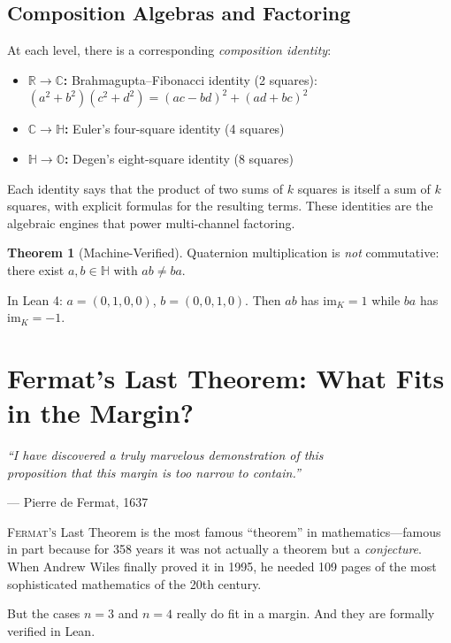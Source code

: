 \documentclass[11pt,twoside,openright]{book}
\theoremstyle{definition}
\newtheorem{theorem}{Theorem}[chapter]
\newcommand{\R}{\mathbb{R}}
\newcommand{\C}{\mathbb{C}}
\newcommand{\HH}{\mathbb{H}}
\newcommand{\OO}{\mathbb{O}}
\begin{document}
\section{Composition Algebras and Factoring}

At each level, there is a corresponding \emph{composition identity}:
\begin{itemize}
\item \textbf{$\R \to \C$:} Brahmagupta--Fibonacci identity (2 squares):
$(a^2+b^2)(c^2+d^2) = (ac-bd)^2 + (ad+bc)^2$
\item \textbf{$\C \to \HH$:} Euler's four-square identity (4 squares)
\item \textbf{$\HH \to \OO$:} Degen's eight-square identity (8 squares)
\end{itemize}

Each identity says that the product of two sums of $k$ squares is itself
a sum of $k$ squares, with explicit formulas for the resulting terms.
These identities are the algebraic engines that power multi-channel factoring.

\begin{theorem}[Machine-Verified]
Quaternion multiplication is \emph{not} commutative: there exist
$a, b \in \HH$ with $ab \neq ba$.

In Lean 4: $a = (0,1,0,0)$, $b = (0,0,1,0)$. Then $ab$ has
$\mathrm{im}_K = 1$ while $ba$ has $\mathrm{im}_K = -1$.
\end{theorem}

\chapter{Fermat's Last Theorem: What Fits in the Margin?}
\label{ch:fermat}

\epigraph{\itshape ``I have discovered a truly marvelous demonstration of this\\
proposition that this margin is too narrow to contain.''}
{--- Pierre de Fermat, 1637}

\lettrine[lines=3]{F}{ermat's} Last Theorem is the most famous ``theorem''
in mathematics---famous in part because for 358 years it was not actually a
theorem but a \emph{conjecture}. When Andrew Wiles finally proved it in 1995,
he needed 109 pages of the most sophisticated mathematics of the 20th century.

But the cases $n = 3$ and $n = 4$ really do fit in a margin. And they
are formally verified in Lean.
\end{document}
